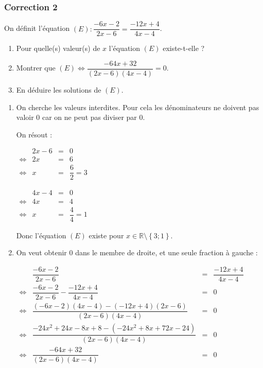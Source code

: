 \documentclass[15pt, mathserif]{beamer}
\newcommand{\R}{\mathbb{R}}			%
\begin{document}
\begin{frame}
\vspace{-10mm}
	\frametitle{Correction 2}
 \vspace*{1cm} 
 
 On définit l'équation $(E):\dfrac{-6x-2}{2x-6}=\dfrac{-12x+4}{4x-4}$. 
 \begin{enumerate} 
 	 \item Pour quelle(s) valeur(s) de $x$ l'équation $(E)$ existe-t-elle ? 
 	 \item Montrer que $(E) \Leftrightarrow \dfrac{-64x+32}{(2x-6)(4x-4)}=0$. 
 	 \item En déduire les solutions de $(E)$. 
 \end{enumerate} 
 
 \begin{enumerate} 
 	 \item On cherche les valeurs interdites. Pour cela les dénominateurs ne doivent pas valoir 0 car on ne peut pas diviser par 0. 
 
 	 On résout : 
 
  \begin{minipage}{0.45\linewidth} 
 	 $\begin{array}{crcl} 
 	 	 & 2x-6& = & 0 \\ 
 	 	 	 \Leftrightarrow &2x & = &6\\ 
 	 	 	 \Leftrightarrow & x & = & \dfrac{6}{2}=3
 	 	 \end{array} $ 
 	 \end{minipage} \hfil \begin{minipage}{0.45\linewidth} 
 	 $\begin{array}{crcl} 
 	 	 & 4x-4& = & 0 \\ 
 	 	 	 \Leftrightarrow &4x & = &4 \\ 
 	 	 	 \Leftrightarrow & x & = & \dfrac{4}{4}=1
 	 	 \end{array} $ 
 
 	 \end{minipage} 
 
 Donc l'équation $(E)$ existe pour $x \in \R \setminus \left\{3;1\right\}$. 
 \end{enumerate} 
 \end{frame} 
 \begin{frame} 
 \begin{enumerate} \setcounter{enumi}{1}  
 	 \item On veut obtenir $0$ dans le membre de droite, et une seule fraction à gauche : 
 
 	 $\begin{array}{crcl} 
 	 	 & \dfrac{-6x-2}{2x-6} & = &\dfrac{-12x+4}{4x-4} \\ 
 	 \Leftrightarrow & \dfrac{-6x-2}{2x-6}-\dfrac{-12x+4}{4x-4} & = & 0 \\ 
 
 \Leftrightarrow & \dfrac{(-6x-2)(4x-4)-(-12x+4)(2x-6)}{(2x-6)(4x-4)} & = & 0 \\ \Leftrightarrow & \dfrac{-24x^2+24x-8x+8-(-24x^2+8x+72x-24)}{(2x-6)(4x-4)}& = & 0 \\ \Leftrightarrow & \dfrac{-64x+32}{(2x-6)(4x-4)} & = & 0 
 	 \end{array}$ 
 \end{enumerate} 
 \end{frame} 
\end{document}
